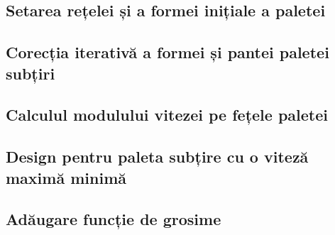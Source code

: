 

\clearpage


\subsection{Setarea rețelei și a formei inițiale a paletei}



\clearpage


\subsection{Corecția iterativă a formei și pantei paletei subțiri}



\clearpage


\subsection{Calculul modulului vitezei pe fețele paletei}



\clearpage

\subsection{Design pentru paleta subțire cu o viteză maximă minimă}



\clearpage


\subsection{Adăugare funcție de grosime}

